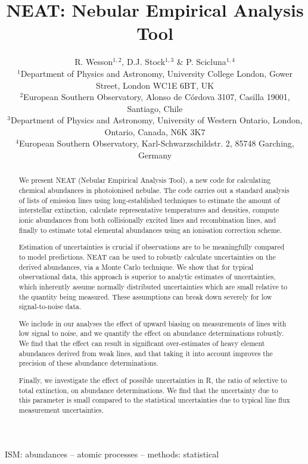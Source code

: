 \documentclass[useAMS,usenatbib]{mn2e}
\title[NEAT]{NEAT: Nebular Empirical Analysis Tool} %
\author[R. Wesson et al.]{R. Wesson$^{1,2}$, D.J. Stock$^{1,3}$ \& P. Scicluna$^{1,4}$\\
$^1$Department of Physics and Astronomy, University College London, Gower Street, London WC1E 6BT, UK\\
$^2$European Southern Observatory, Alonso de C\'ordova 3107, Casilla 19001, Santiago, Chile\\
$^3$Department of Physics and Astronomy, University of Western Ontario, London, Ontario, Canada, N6K 3K7\\
$^4$European Southern Observatory, Karl-Schwarzschildstr. 2, 85748 Garching, Germany\\ 
}
\begin{document}
\date{}

\pagerange{\pageref{firstpage}--\pageref{lastpage}} 

\maketitle

\label{firstpage}

\begin{abstract}
We present NEAT (Nebular Empirical Analysis Tool), a new code for calculating chemical abundances in photoionised nebulae.  The code carries out a standard analysis of lists of emission lines using long-established techniques to estimate the amount of interstellar extinction, calculate representative temperatures and densities, compute ionic abundances from both collisionally excited lines and recombination lines, and finally to estimate total elemental abundances using an ionisation correction scheme.

Estimation of uncertainties is crucial if observations are to be meaningfully compared to model predictions.  NEAT can be used to robustly calculate uncertainties on the derived abundances, via a Monte Carlo technique.  We show that for typical observational data, this approach is superior to analytic estimates of uncertainties, which inherently assume normally distributed uncertainties which are small relative to the quantity being measured.  These assumptions can break down severely for low signal-to-noise data.

We include in our analyses the effect of upward biasing on measurements of lines with low signal to noise, and we quantify the effect on abundance determinations robustly.  We find that the effect can result in significant over-estimates of heavy element abundances derived from weak lines, and that taking it into account improves the precision of these abundance determinations.

Finally, we investigate the effect of possible uncertainties in R, the ratio of selective to total extinction, on abundance determinations.  We find that the uncertainty due to this parameter is small compared to the statistical uncertainties due to typical line flux measurement uncertainties.

\end{abstract}

\begin{keywords}
ISM: abundances -- atomic processes -- methods: statistical
\end{keywords}
\end{document}
